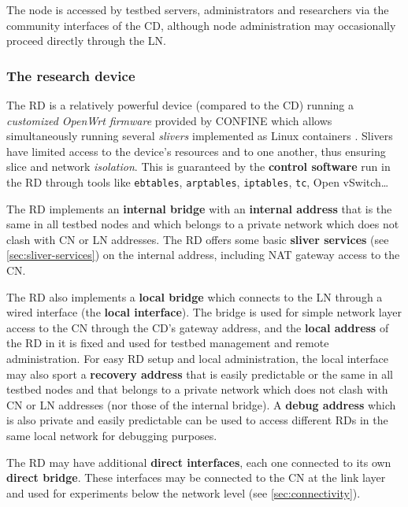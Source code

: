 \documentclass[conference]{IEEEtran}
\begin{document}
The node is accessed by testbed servers, administrators and researchers via
the community interfaces of the CD, although node administration may
occasionally proceed directly through the LN.

\subsubsection{The research device}

The RD is a relatively powerful device (compared to the CD) running a
\emph{customized OpenWrt firmware} provided by CONFINE which allows simultaneously running
several \emph{slivers} implemented as Linux containers \cite{lxc}.
Slivers have limited access to the device's resources and to one another, thus
ensuring slice and network \emph{isolation}.  This is guaranteed by the
\textbf{control software} run in the RD through tools like \texttt{ebtables},
\texttt{arptables}, \texttt{iptables}, \texttt{tc}, Open vSwitch…


The RD implements an \textbf{internal bridge} with an \textbf{internal
  address} that is the same in all testbed nodes and which belongs to a
private network which does not clash with CN or LN addresses.  The RD offers
some basic \textbf{sliver services} (see \ref{sec:sliver-services}) on the
internal address, including NAT gateway access to the CN.

The RD also implements a \textbf{local bridge} which connects to the LN
through a wired interface (the \textbf{local interface}).  The bridge is used
for simple network layer access to the CN through the CD's gateway address,
and the \textbf{local address} of the RD in it is fixed and used for testbed
management and remote administration.  For easy RD setup and local
administration, the local interface may also sport a \textbf{recovery address}
that is easily predictable or the same in all testbed nodes and that belongs
to a private network which does not clash with CN or LN addresses (nor those
of the internal bridge).  A \textbf{debug address} which is also private and
easily predictable can be used to access different RDs in the same local
network for debugging purposes.

The RD may have additional \textbf{direct interfaces}, each one connected to
its own \textbf{direct bridge}.  These interfaces may be connected to the CN
at the link layer and used for experiments below the network level (see
\ref{sec:connectivity}).
\end{document}

